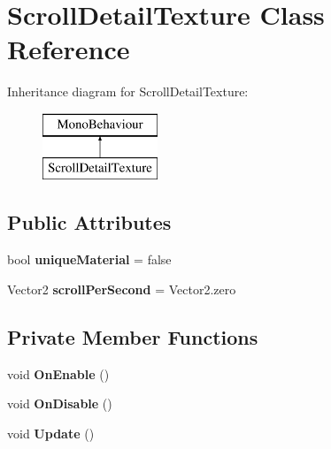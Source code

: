 \hypertarget{class_scroll_detail_texture}{}\section{Scroll\+Detail\+Texture Class Reference}
\label{class_scroll_detail_texture}
Inheritance diagram for Scroll\+Detail\+Texture\+:\begin{figure}[H]
\begin{center}
\leavevmode
\includegraphics[height=2.000000cm]{class_scroll_detail_texture}
\end{center}
\end{figure}
\subsection*{Public Attributes}
\begin{DoxyCompactItemize}
\item 
\mbox{\label{class_scroll_detail_texture_a9f84d643fdc13014b8d1197b0b7f2e7a}} 
bool {\bfseries unique\+Material} = false
\item 
\mbox{\label{class_scroll_detail_texture_a22e1c4cce6c2f6dfdd1508c6f93ba7e7}} 
Vector2 {\bfseries scroll\+Per\+Second} = Vector2.\+zero
\end{DoxyCompactItemize}
\subsection*{Private Member Functions}
\begin{DoxyCompactItemize}
\item 
\mbox{\label{class_scroll_detail_texture_a9d6bc12d5c4246e3eb4074531c3e7733}} 
void {\bfseries On\+Enable} ()
\item 
\mbox{\label{class_scroll_detail_texture_acca3195e68542fe9ca95ee94ef95ec69}} 
void {\bfseries On\+Disable} ()
\item 
\mbox{\label{class_scroll_detail_texture_a19d5a4d1b44afd03a5ad7535a872fe54}} 
void {\bfseries Update} ()
\end{DoxyCompactItemize}
